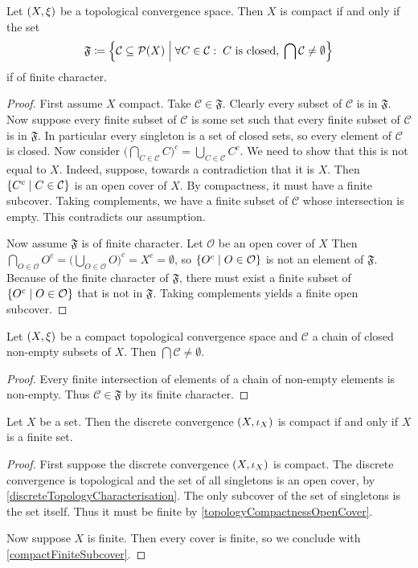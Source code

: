 \begin{corollary}
Let $\sSet{X,\xi}$ be a topological convergence space. Then $X$ is compact \textup{if and only if} the set
\[ \mathfrak{F} \defeq \setbuilder{\mathcal{C}\subseteq \powerset(X)}{\forall C\in \mathcal{C}: \;\text{$C$ is closed},\; \bigcap \mathcal{C} \neq \emptyset} \]
if of finite character.
\end{corollary}
\begin{proof}
First assume $X$ compact. Take $\mathcal{C}\in \mathfrak{F}$. Clearly every subset of $\mathcal{C}$ is in $\mathfrak{F}$. Now suppose every finite subset of $\mathcal{C}$ is some set such that every finite subset of $\mathcal{C}$ is in $\mathfrak{F}$. In particular every singleton is a set of closed sets, so every element of $\mathcal{C}$ is closed. Now consider $\Big(\bigcap_{C\in \mathcal{C}} C\Big)^c = \bigcup_{C\in \mathcal{C}}C^c$. We need to show that this is not equal to $X$. Indeed, suppose, towards a contradiction that it is $X$. Then $\setbuilder{C^c}{C\in \mathcal{C}}$ is an open cover of $X$. By compactness, it must have a finite subcover. Taking complements, we have a finite subset of $\mathcal{C}$ whose intersection is empty. This contradicts our assumption.

Now assume $\mathfrak{F}$ is of finite character. Let $\mathcal{O}$ be an open cover of $X$ Then $\bigcap_{O\in\mathcal{O}} O^c = \Big(\bigcup_{O\in\mathcal{O}}O\Big)^c = X^c = \emptyset$, so $\setbuilder{O^c}{O\in \mathcal{O}}$ is not an element of $\mathfrak{F}$. Because of the finite character of $\mathfrak{F}$, there must exist a finite subset of $\setbuilder{O^c}{O\in \mathcal{O}}$ that is not in $\mathfrak{F}$. Taking complements yields a finite open subcover.
\end{proof}
\begin{corollary} \label{intersectionClosedChainCompactSet}
Let $\sSet{X,\xi}$ be a compact topological convergence space and $\mathcal{C}$ a chain of closed non-empty subsets of $X$. Then $\bigcap \mathcal{C} \neq \emptyset$.
\end{corollary}
\begin{proof}
Every finite intersection of elements of a chain of non-empty elements is non-empty. Thus $\mathcal{C}\in \mathfrak{F}$ by its finite character.
\end{proof}

\begin{lemma} \label{discreteCompactIffFinite}
Let $X$ be a set. Then the discrete convergence $\sSet{X,\iota_X}$ is compact \textup{if and only if} $X$ is a finite set.
\end{lemma}
\begin{proof}
First suppose the discrete convergence $\sSet{X,\iota_X}$ is compact. The discrete convergence is topological and the set of all singletons is an open cover, by \ref{discreteTopologyCharacterisation}. The only subcover of the set of singletons is the set itself. Thus it must be finite by \ref{topologyCompactnessOpenCover}.

Now suppose $X$ is finite. Then every cover is finite, so we conclude with \ref{compactFiniteSubcover}.
\end{proof}

